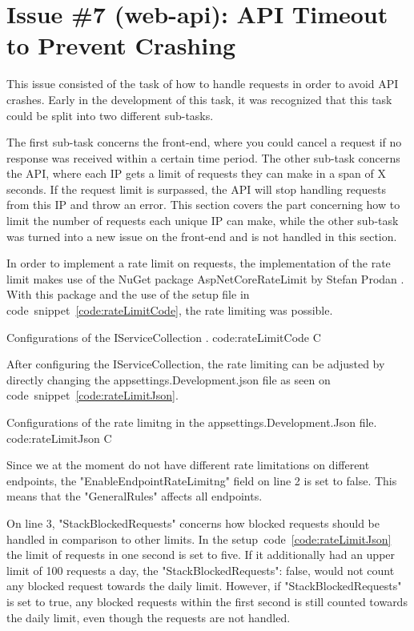 \section{Issue \#7 (web-api): API Timeout to Prevent Crashing}
This issue consisted of the task of how to handle requests in order to avoid API crashes. Early in the development of this task, it was recognized that this task could be split into two different sub-tasks. 

The first sub-task concerns the front-end, where you could cancel a request if no response was received within a certain time period.
The other sub-task concerns the API, where each IP gets a limit of requests they can make in a span of X seconds. If the request limit is surpassed, the API will stop handling requests from this IP and throw an error.
This section covers the part concerning how to limit the number of requests each unique IP can make, while the other sub-task was turned into a new issue on the front-end and is not handled in this section.

In order to implement a rate limit on requests, the implementation of the rate limit makes use of the NuGet package AspNetCoreRateLimit by Stefan Prodan \citep{cite:rateLimitGithub}. With this package and the use of the setup file in code~snippet~\ref{code:rateLimitCode}, the rate limiting was possible.

        {Configurations of the IServiceCollection \citep{cite:rateLimitGithub}.} %
        {code:rateLimitCode} %
        {C} %


After configuring the IServiceCollection, the rate limiting can be adjusted by directly changing the appsettings.Development.json file as seen on code~snippet~\ref{code:rateLimitJson}.

        {Configurations of the rate limitng in the appsettings.Development.Json file.} %
        {code:rateLimitJson} %
        {C} %

Since we at the moment do not have different rate limitations on different endpoints, the "EnableEndpointRateLimitng" field on line 2 is set to false. This means that the "GeneralRules" affects all endpoints. 

On line 3, "StackBlockedRequests" concerns how blocked requests should be handled in comparison to other limits. In the setup~code~\ref{code:rateLimitJson} the limit of requests in one second is set to five. If it additionally had an upper limit of 100 requests a day, the "StackBlockedRequests": false, would not count any blocked request towards the daily limit. However, if "StackBlockedRequests" is set to true, any blocked requests within the first second is still counted towards the daily limit, even though the requests are not handled.

